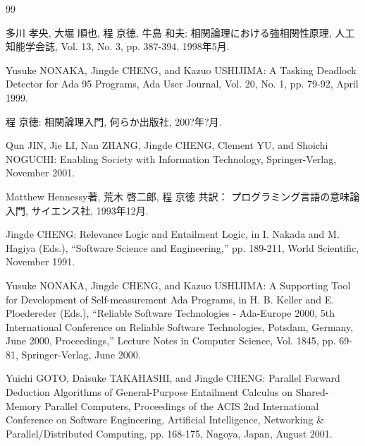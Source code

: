 \documentclass[12pt,epsf,dvipdfmx]{jreport}
\begin{document}
\newpage

%

\begin{thebibliography}{99}
\label{sannkoubunnkenn_chapter}


多川 孝央, 大堀 順也, 程 京徳, 牛島 和夫: 相関論理における強相関性原理,
        人工知能学会誌, Vol. 13, No. 3, pp. 387-394, 1998年5月.

Yusuke NONAKA, Jingde CHENG, and Kazuo USHIJIMA: A Tasking Deadlock
        Detector for Ada 95 Programs, Ada User Journal, Vol. 20, No. 1,
        pp. 79-92, April 1999.

程 京徳: 相関論理入門, 何らか出版社, 200?年?月.

Qun JIN, Jie LI, Nan ZHANG, Jingde CHENG, Clement YU, and Shoichi
        NOGUCHI: Enabling Society with Information Technology,
        Springer-Verlag, November 2001.

Matthew Hennessy著, 荒木 啓二郎, 程 京徳 共訳：
プログラミング言語の意味論入門, サイエンス社, 1993年12月.

Jingde CHENG: Relevance Logic and Entailment Logic, in I. Nakada and
        M. Hagiya (Eds.), ``Software Science and Engineering,''
        pp. 189-211, World Scientific, November 1991.

Yusuke NONAKA, Jingde CHENG, and Kazuo USHIJIMA: A Supporting Tool for
        Development of Self-measurement Ada Programs, in H. B. Keller
        and E. Ploedereder (Eds.), ``Reliable Software Technologies -
        Ada-Europe 2000, 5th International Conference on Reliable
        Software Technologies, Potsdam, Germany, June 2000,
        Proceedings,'' Lecture Notes in Computer Science, Vol. 1845,
        pp. 69-81, Springer-Verlag, June 2000.

Yuichi GOTO, Daisuke TAKAHASHI, and Jingde CHENG: Parallel Forward
        Deduction Algorithms of General-Purpose Entailment Calculus on
        Shared-Memory Parallel Computers, Proceedings of the ACIS 2nd
        International Conference on Software Engineering, Artificial
        Intelligence, Networking \& Parallel/Distributed Computing,
        pp. 168-175, Nagoya, Japan, August 2001.


\end{thebibliography}
\end{document}
